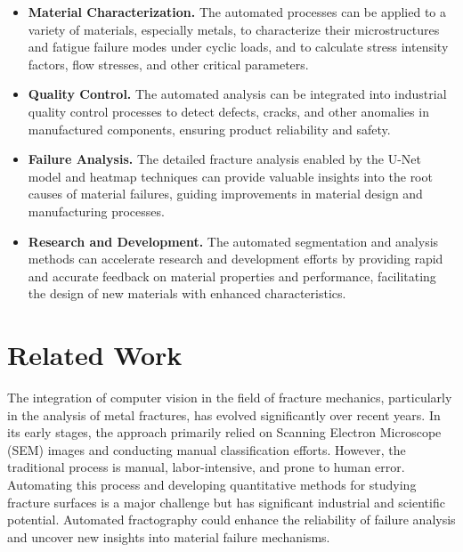 \documentclass{ieeeaccess}
\begin{document}
\begin{itemize}
    \item \textbf{Material Characterization.} The automated processes can be applied to a variety of materials, especially metals, to characterize their microstructures and fatigue failure modes under cyclic loads, and to calculate stress intensity factors, flow stresses, and other critical parameters.
    \item \textbf{Quality Control.} The automated analysis can be integrated into industrial quality control processes to detect defects, cracks, and other anomalies in manufactured components, ensuring product reliability and safety.
    \item \textbf{Failure Analysis.} The detailed fracture analysis enabled by the U-Net model and heatmap techniques can provide valuable insights into the root causes of material failures, guiding improvements in material design and manufacturing processes.
    \item \textbf{Research and Development.} The automated segmentation and analysis methods can accelerate research and development efforts by providing rapid and accurate feedback on material properties and performance, facilitating the design of new materials with enhanced characteristics.
\end{itemize}


\section{Related Work}
 The integration of computer vision in the field of fracture mechanics, particularly in the analysis of metal fractures, has evolved significantly over recent years.
In its early stages, the approach primarily relied on Scanning Electron Microscope (SEM) images and conducting manual classification efforts.
However, the traditional process is manual, labor-intensive, and prone to human error.
Automating this process and developing quantitative methods for studying fracture surfaces is a major challenge but has significant industrial and scientific potential.
Automated fractography could enhance the reliability of failure analysis and uncover new insights into material failure mechanisms.
\end{document}

